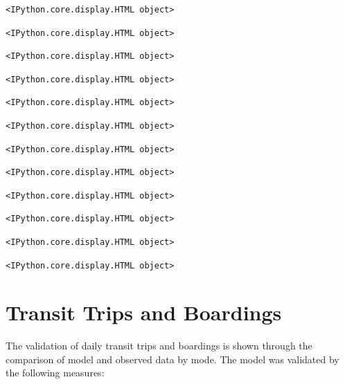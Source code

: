 \documentclass[
  letterpaper,
  DIV=11,
  numbers=noendperiod]{scrreprt}
\begin{document}
\begin{verbatim}
<IPython.core.display.HTML object>
\end{verbatim}

\begin{verbatim}
<IPython.core.display.HTML object>
\end{verbatim}

\begin{verbatim}
<IPython.core.display.HTML object>
\end{verbatim}

\begin{verbatim}
<IPython.core.display.HTML object>
\end{verbatim}

\begin{verbatim}
<IPython.core.display.HTML object>
\end{verbatim}

\begin{verbatim}
<IPython.core.display.HTML object>
\end{verbatim}

\begin{verbatim}
<IPython.core.display.HTML object>
\end{verbatim}

\begin{verbatim}
<IPython.core.display.HTML object>
\end{verbatim}

\begin{verbatim}
<IPython.core.display.HTML object>
\end{verbatim}

\begin{verbatim}
<IPython.core.display.HTML object>
\end{verbatim}

\begin{verbatim}
<IPython.core.display.HTML object>
\end{verbatim}

\begin{verbatim}
<IPython.core.display.HTML object>
\end{verbatim}

\hypertarget{transit-trips-and-boardings}{%
\section{Transit Trips and
Boardings}\label{transit-trips-and-boardings}}

The validation of daily transit trips and boardings is shown through the
comparison of model and observed data by mode. The model was validated
by the following measures:
\end{document}
